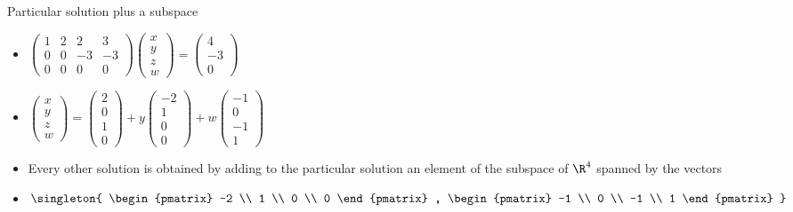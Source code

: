 \documentclass{beamer}
\begin{document}
\begin{frame}{Particular solution plus a subspace}

\begin{itemize}
\item
$
\begin{pmatrix}
1 & 2 & 2 & 3 \\
0 & 0 & -3 & -3 \\
0 & 0 & 0 & 0
\end{pmatrix}
\begin{pmatrix}
x \\ y \\ z \\ w
\end{pmatrix}
=
\begin{pmatrix}
4 \\ -3 \\  0
\end{pmatrix}
$
\item
$
\begin{pmatrix}
x \\ y \\ z \\ w
\end{pmatrix}
=
\begin{pmatrix}
2 \\
0 \\
1 \\
0
\end{pmatrix}
+
y
\begin{pmatrix}
-2 \\
1 \\
0 \\
0
\end{pmatrix}
+
w
\begin{pmatrix}
-1 \\
0 \\
-1 \\
1
\end{pmatrix}
$

\item Every other solution is obtained by adding to the particular solution an element of the subspace of $\R^4$ spanned by the vectors
\item
$
\singleton{
\begin{pmatrix}
-2 \\
1 \\
0 \\
0
\end{pmatrix}
,
\begin{pmatrix}
-1 \\
0 \\
-1 \\
1
\end{pmatrix}
}
$

\end{itemize}
\end{frame}
\end{document}
